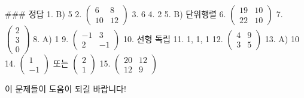 ### 정답
1. B) 5  
2. \(\begin{pmatrix} 6 & 8 \\ 10 & 12 \end{pmatrix}\)  
3. 6  
4. 2  
5. B) 단위행렬  
6. \(\begin{pmatrix} 19 & 10 \\ 22 & 10 \end{pmatrix}\)  
7. \(\begin{pmatrix} 2 \\ 3 \\ 0 \end{pmatrix}\)  
8. A) 1  
9. \(\begin{pmatrix} -1 & 3 \\ 2 & -1 \end{pmatrix}\)  
10. 선형 독립  
11. 1, 1, 1  
12. \(\begin{pmatrix} 4 & 9 \\ 3 & 5 \end{pmatrix}\)  
13. A) 10  
14. \(\begin{pmatrix} 1 \\ -1 \end{pmatrix}\) 또는 \(\begin{pmatrix} 2 \\ 1 \end{pmatrix}\)  
15. \(\begin{pmatrix} 20 & 12 \\ 12 & 9 \end{pmatrix}\)  

이 문제들이 도움이 되길 바랍니다!